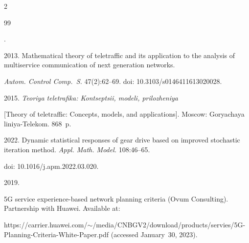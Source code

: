 \begin{multicols}{2}
{{\begin{thebibliography}{99}
 




.


 2013. Mathematical theory of teletraffic and its application to the analysis of multiservice communication of next generation networks. 


 \textit{Autom. Control Comp.~S.} 47(2):62--69. doi: 10.3103/s0146411613020028.







 2015. \textit{Teo\-riya te\-le\-tra\-fi\-ka: Kon\-tsep\-tsii, mo\-de\-li, pri\-lo\-zhe\-niya} 


[Theory of teletraffic: Concepts, models, and applications]. Moscow: Goryachaya liniya-Telekom. 868~p.









2022. Dynamic statistical responses of gear drive based on improved stochastic iteration method. \textit{Appl. Math. Model.} 108:46--65.


doi: 10.1016/j.apm.2022.03.020.




 2019. 


5G service experience-based network planning criteria  (Ovum Consulting). Partnership with Huawei. Available at: 


{\sf https://carrier.huawei.com/$\sim$/media/\linebreak CNBGV2/download/products/servies/5G-Planning-Criteria-White-Paper.pdf} (accessed January~30, 2023).


  \end{thebibliography}





 }


 }





\end{multicols}





\vspace*{-6pt}





